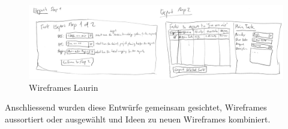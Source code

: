 	\begin{figure}[H]
		\begin{minipage}[b]{\linewidth}		
			\includegraphics[width=\linewidth]{interfacesAndProtocols/media/img/wireframesLaurin3.jpg}
		\end{minipage}			
		\centering
		\caption{Wireframes Laurin}
		\label{fig:wireframesLaurin}
	\end{figure}
	
	Anschliessend wurden diese Entwürfe gemeinsam gesichtet, 
	Wireframes aussortiert oder ausgewählt und Ideen zu neuen Wireframes kombiniert.
	
